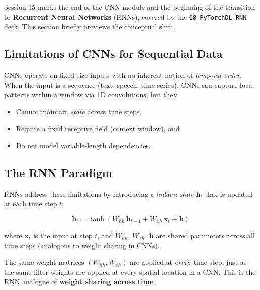 \documentclass[12pt,a4paper]{article}
\begin{document}
Session 15 marks the end of the CNN module and the beginning of the
transition to \textbf{Recurrent Neural Networks} (RNNs), covered by the
\texttt{08\_PyTorchDL\_RNN} deck. This section briefly previews the
conceptual shift.

\subsection{Limitations of CNNs for Sequential Data}

CNNs operate on fixed-size inputs with no inherent notion of \emph{temporal
order}. When the input is a sequence (text, speech, time series), CNNs can
capture local patterns within a window via 1D convolutions, but they
\begin{itemize}[noitemsep]
  \item Cannot maintain \emph{state} across time steps,
  \item Require a fixed receptive field (context window), and
  \item Do not model variable-length dependencies.
\end{itemize}

\subsection{The RNN Paradigm}

RNNs address these limitations by introducing a \emph{hidden state}
$\mathbf{h}_t$ that is updated at each time step $t$:

\begin{equation}
  \mathbf{h}_t = \tanh\!\left(W_{hh}\,\mathbf{h}_{t-1}
                             + W_{xh}\,\mathbf{x}_t + \mathbf{b}\right)
  \label{eq:rnn_cell}
\end{equation}

where $\mathbf{x}_t$ is the input at step $t$, and
$W_{hh}$, $W_{xh}$, $\mathbf{b}$ are shared parameters across all time
steps (analogous to weight sharing in CNNs).

\begin{keyinsight}
The same weight matrices $(W_{hh}, W_{xh})$ are applied at every time step,
just as the same filter weights are applied at every spatial location in a
CNN. This is the RNN analogue of \textbf{weight sharing across time}.
\end{keyinsight}
\end{document}
